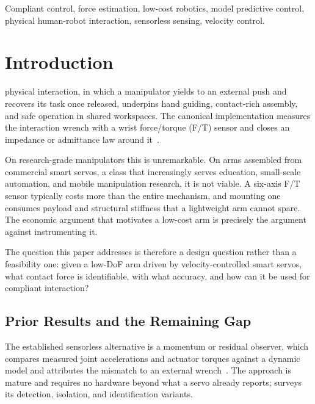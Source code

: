 \documentclass{ieeeaccess}
\begin{document}
\begin{keywords}
Compliant control, force estimation, low-cost robotics, model
predictive control, physical human-robot interaction, sensorless sensing,
velocity control.
\end{keywords}

\titlepgskip=-21pt

\maketitle

\section{Introduction}
\label{sec:introduction}

 physical interaction, in which a manipulator yields to an
external push and recovers its task once released, underpins hand guiding,
contact-rich assembly, and safe operation in shared workspaces. The canonical
implementation measures the interaction wrench with a wrist force/torque (F/T)
sensor and closes an impedance or admittance law around
it~\cite{hogan1985impedance,siciliano1999forcecontrol}.

On research-grade manipulators this is unremarkable. On arms assembled from
commercial smart servos, a class that increasingly serves education, small-scale
automation, and mobile manipulation research, it is not viable. A six-axis F/T
sensor typically costs more than the entire mechanism, and mounting one consumes
payload and structural stiffness that a lightweight arm cannot spare. The economic
argument that motivates a low-cost arm is precisely the argument against
instrumenting it.

The question this paper addresses is therefore a design question rather than a
feasibility one: given a low-DoF arm driven by velocity-controlled smart servos,
what contact force is identifiable, with what accuracy, and how can it be used for
compliant interaction?

\subsection{Prior Results and the Remaining Gap}
The established sensorless alternative is a momentum or residual observer, which
compares measured joint accelerations and actuator torques against a dynamic model
and attributes the mismatch to an external
wrench~\cite{deluca2005sensorless,deluca2006collision,magrini2014virtual}. The
approach is mature and requires no hardware beyond what a servo already reports;
\cite{haddadin2017survey} surveys its detection, isolation, and identification
variants.
\end{document}

